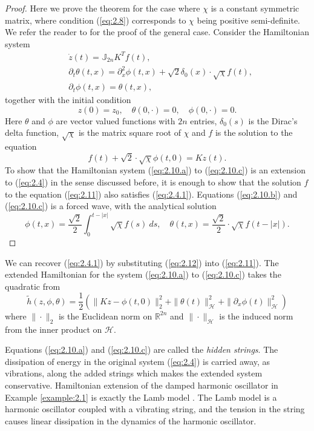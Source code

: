 \begin{proof}
Here we prove the theorem for the case where $\chi$ is a constant symmetric matrix, where condition (\ref{eq:2.8}) corresponds to $\chi$ being positive semi-definite. We refer the reader to \cite{Figotin:2006jy} for the proof of the general case. Consider the Hamiltonian system
\begin{subequations}
\begin{align}
		\label{eq:2.10.a} & \dot{z}(t) = \mathbb J_{2n} K^T f(t), \\
		\label{eq:2.10.b} & \partial_t \theta(t,x) = \partial_x^2 \phi(t,x) + \sqrt 2 \delta_0(x) \cdot \sqrt{\chi}  f(t), \\
		\label{eq:2.10.c} & \partial_t \phi(t,x) = \theta(t,x),
\end{align}
\end{subequations}
together with the initial condition
\begin{equation} \label{eq:2.10.1}
	z(0) = z_0,\quad \theta(0,\cdot) = 0, \quad \phi(0,\cdot) = 0.
\end{equation}
Here $\theta$ and $\phi$ are vector valued functions with $2n$ entries, $\delta_0(s)$ is the Dirac's delta function, $\sqrt{ \chi}$ is the matrix square root of $\chi$ and $f$ is the solution to the equation
\begin{equation} \label{eq:2.11}
	f(t) + \sqrt{2} \cdot \sqrt{ \chi } \phi(t,0) = Kz(t).
\end{equation}
To show that the Hamiltonian system (\ref{eq:2.10.a}) to (\ref{eq:2.10.c}) is an extension to (\ref{eq:2.4}) in the sense discussed before, it is enough to show that the solution $f$ to the equation (\ref{eq:2.11}) also satisfies (\ref{eq:2.4.1}). Equations (\ref{eq:2.10.b}) and (\ref{eq:2.10.c}) is a forced wave, with the analytical solution
\begin{equation} \label{eq:2.12}
	\phi(t,x) = \frac {\sqrt 2} 2 \int_0^{t-|x|} \sqrt{\chi} f(s)\ ds,\quad \theta(t,x) = \frac{\sqrt 2}{2} \cdot \sqrt{\chi} f(t - |x|).
\end{equation}
\end{proof}
We can recover (\ref{eq:2.4.1}) by substituting (\ref{eq:2.12}) into (\ref{eq:2.11}). The extended Hamiltonian for the system (\ref{eq:2.10.a}) to (\ref{eq:2.10.c}) takes the quadratic from
\begin{equation}
	\tilde h(z,\phi,\theta) = \frac 1 2 \left( \| Kz - \phi(t,0) \|_2^2 + \| \theta(t) \|^2_{\mathcal H } + \| \partial_x\phi(t)\|^2_{\mathcal H }\right)
\end{equation}
where $\| \cdot \|_2$ is the Euclidean norm on $\mathbb R^{2n}$ and $\| \cdot \|_{\mathcal H}$ is the induced norm from the inner product on $\mathcal H$. 

Equations (\ref{eq:2.10.a}) and (\ref{eq:2.10.c}) are called the \emph{hidden strings}. The dissipation of energy in the original system (\ref{eq:2.4}) is carried away, as vibrations, along the added strings which makes the extended system conservative. Hamiltonian extension of the damped harmonic oscillator in Example \ref{example:2.1} is exactly the Lamb model \cite{lamb:1900}. The Lamb model is a harmonic oscillator coupled with a vibrating string, and the tension in the string causes linear dissipation in the dynamics of the harmonic oscillator.
